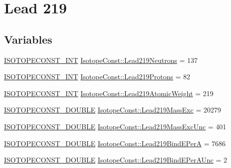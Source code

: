 \hypertarget{group___isotope_const-_lead-_pb219}{}\section{Lead 219}
\label{group___isotope_const-_lead-_pb219}
\subsection*{Variables}
\begin{DoxyCompactItemize}
\item 
\mbox{\hyperlink{group___isotope_const-_macros_ga5f18360b3e99483a35c32d789e62621c}{I\+S\+O\+T\+O\+P\+E\+C\+O\+N\+S\+T\+\_\+\+I\+NT}} \mbox{\hyperlink{group___isotope_const-_lead-_pb219_ga50e5fe2c8a737136256a35094828ef9c}{Isotope\+Const\+::\+Lead219\+Neutrons}} = 137
\item 
\mbox{\hyperlink{group___isotope_const-_macros_ga5f18360b3e99483a35c32d789e62621c}{I\+S\+O\+T\+O\+P\+E\+C\+O\+N\+S\+T\+\_\+\+I\+NT}} \mbox{\hyperlink{group___isotope_const-_lead-_pb219_ga1df5440fc797472034c65b3d1b0d1ce5}{Isotope\+Const\+::\+Lead219\+Protons}} = 82
\item 
\mbox{\hyperlink{group___isotope_const-_macros_ga5f18360b3e99483a35c32d789e62621c}{I\+S\+O\+T\+O\+P\+E\+C\+O\+N\+S\+T\+\_\+\+I\+NT}} \mbox{\hyperlink{group___isotope_const-_lead-_pb219_ga2d34115dc7b39cf4086a03217e662f4f}{Isotope\+Const\+::\+Lead219\+Atomic\+Weight}} = 219
\item 
\mbox{\hyperlink{group___isotope_const-_macros_ga8f45a7272ce02c0b4c65c44636ed719a}{I\+S\+O\+T\+O\+P\+E\+C\+O\+N\+S\+T\+\_\+\+D\+O\+U\+B\+LE}} \mbox{\hyperlink{group___isotope_const-_lead-_pb219_ga818acebb641b26b1de6b6663fe49d3a3}{Isotope\+Const\+::\+Lead219\+Mass\+Exc}} = 20279
\item 
\mbox{\hyperlink{group___isotope_const-_macros_ga8f45a7272ce02c0b4c65c44636ed719a}{I\+S\+O\+T\+O\+P\+E\+C\+O\+N\+S\+T\+\_\+\+D\+O\+U\+B\+LE}} \mbox{\hyperlink{group___isotope_const-_lead-_pb219_ga74407d6f8258d3228d9ae00086a66158}{Isotope\+Const\+::\+Lead219\+Mass\+Exc\+Unc}} = 401
\item 
\mbox{\hyperlink{group___isotope_const-_macros_ga8f45a7272ce02c0b4c65c44636ed719a}{I\+S\+O\+T\+O\+P\+E\+C\+O\+N\+S\+T\+\_\+\+D\+O\+U\+B\+LE}} \mbox{\hyperlink{group___isotope_const-_lead-_pb219_ga986f11938e0250e040f45a1a2258f56f}{Isotope\+Const\+::\+Lead219\+Bind\+E\+PerA}} = 7686
\item 
\mbox{\hyperlink{group___isotope_const-_macros_ga8f45a7272ce02c0b4c65c44636ed719a}{I\+S\+O\+T\+O\+P\+E\+C\+O\+N\+S\+T\+\_\+\+D\+O\+U\+B\+LE}} \mbox{\hyperlink{group___isotope_const-_lead-_pb219_gadd908050b62657874bb33c7b9b22efcf}{Isotope\+Const\+::\+Lead219\+Bind\+E\+Per\+A\+Unc}} = 2

\end{DoxyCompactItemize}
